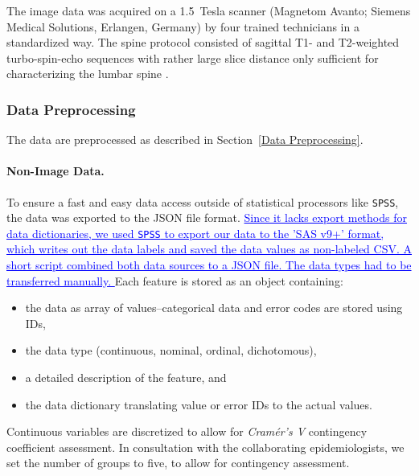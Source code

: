\documentclass[journal]{style/vgtc} 			          %
\newcommand{\add}[1]{\textcolor{blue}{\uline{#1}}}
\begin{document}
The image data was acquired on a 1.5~Tesla scanner (Magnetom Avanto; Siemens Medical Solutions, Erlangen, Germany) by four trained technicians in a standardized way.
%
The spine protocol consisted of sagittal T1- and T2-weighted turbo-spin-echo sequences with rather large slice distance only sufficient for characterizing the lumbar spine \cite{Hegenscheid2013}.

\subsubsection{Data Preprocessing} \label{application:Data Preprocessing}
The data are preprocessed as described in Section~\ref{Data Preprocessing}.
%
\paragraph{Non-Image Data.} 

To ensure a fast and easy data access outside of statistical processors like \texttt{SPSS}, the data was exported to the JSON file format.
%
\add{
Since it lacks export methods for data dictionaries, we used \texttt{SPSS} to export our data to the 'SAS v9+' format, which writes out the data labels and saved the data values as non-labeled CSV.
%
A short script combined both data sources to a JSON file.
%
The data types had to be transferred manually.
}
%
Each feature is stored as an object containing: 
\begin{itemize}
	\item the data as array of values--categorical data and error codes are stored using IDs,
	\item the data type (continuous, nominal, ordinal, dichotomous),
	\item a detailed description of the feature, and
	\item the data dictionary translating value or error IDs to the actual values.
\end{itemize}
%
Continuous variables are discretized to allow for \emph{Cram\'{e}r's V} contingency coefficient assessment.
%
In consultation with the collaborating epidemiologists, we set the number of groups to five, to allow for contingency assessment.
\end{document}
